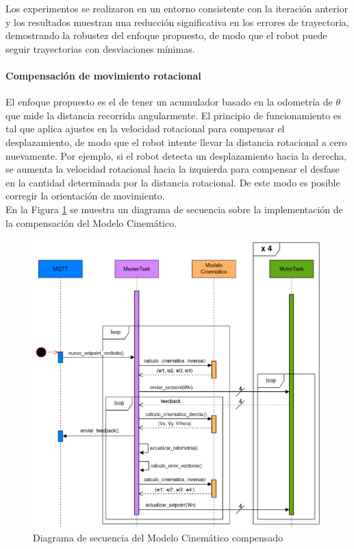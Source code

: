 Los experimentos se realizaron en un entorno consistente con la iteración anterior y los resultados muestran una reducción significativa en los errores de trayectoria, demostrando la robustez del enfoque propuesto, de modo que el robot puede seguir trayectorias con desviaciones mínimas.

\paragraph{Compensación de movimiento rotacional} \mbox{} \vspace{8pt}

El enfoque propuesto es el de tener un acumulador basado en la odometría de $\theta$ que mide la distancia recorrida angularmente. El principio de funcionamiento es tal que aplica ajustes en la velocidad rotacional para compensar el desplazamiento, de modo que el robot intente llevar la distancia rotacional a cero nuevamente. Por ejemplo, si el robot detecta un desplazamiento hacia la derecha, se aumenta la velocidad rotacional hacia la izquierda para compensar el desfase en la cantidad determinada por la distancia rotacional. De este modo es posible corregir la orientación de movimiento. \\

En la Figura \ref{fig:diagsecuenciamodcinemcompens} se muestra un diagrama de secuencia sobre la implementación de la compensación del Modelo Cinemático.

\begin{figure}[htb]
    \centering
    \includegraphics[width=1\linewidth]{images/diag_secuencia_modelo_cinematico_compensado.png}
    \caption{Diagrama de secuencia del Modelo Cinemático compensado}
    \label{fig:diagsecuenciamodcinemcompens}
\end{figure}


